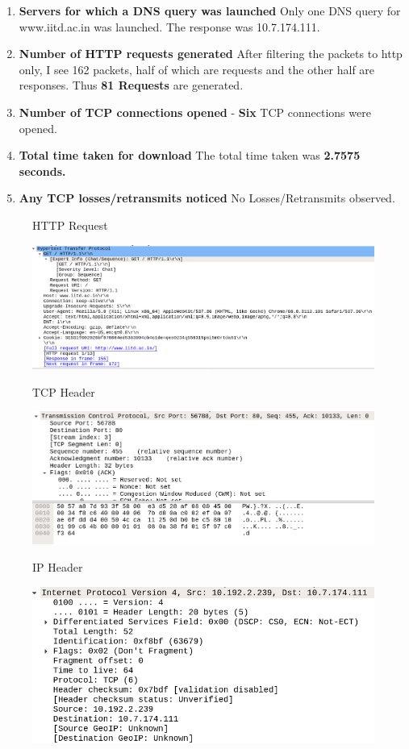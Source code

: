 \documentclass[12pt]{article}
\begin{document}
\begin{enumerate}
\item \textbf{Servers for which a DNS query was launched} Only one DNS query for www.iitd.ac.in was launched. The response was 10.7.174.111. 
\item \textbf{Number of HTTP requests generated} After filtering the packets to http only, I see 162 packets, half of which are requests and the other half are responses. Thus \textbf{81 Requests} are generated.
\item \textbf{Number of TCP connections opened} - 
 \textbf{Six} TCP connections were opened.
\item \textbf{Total time taken for download} The total time taken was \textbf{2.7575 seconds.}
\item \textbf{Any TCP losses/retransmits noticed} No Losses/Retransmits observed.
\end{enumerate}


\begin{figure}[b]
HTTP Request
\begin{center}
\includegraphics[scale=0.3]{httph}
\end{center}
\end{figure}

\begin{figure}[b]
TCP Header
\begin{center}
\includegraphics[scale=0.3]{tcph}
\end{center}
\end{figure}

\begin{figure}[b]
IP Header
\begin{center}
\includegraphics[scale=0.3]{iph}
\end{center}
\end{figure}
\end{document}
